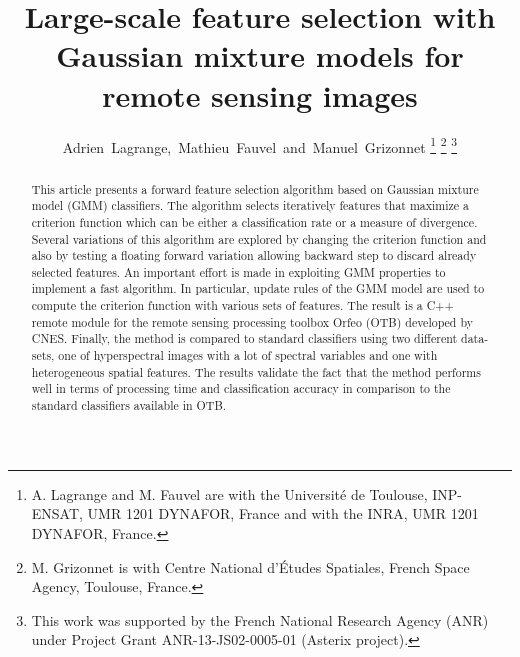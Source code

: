 \documentclass[journal]{IEEEtran}
\begin{document}
%
\title{Large-scale feature selection with Gaussian mixture models for remote sensing images}
%
%
%

\author{Adrien~Lagrange,~Mathieu~Fauvel~and~Manuel~Grizonnet%
\thanks{A. Lagrange and M. Fauvel are with the Universit\'{e} de Toulouse,
INP-ENSAT, UMR 1201 DYNAFOR, France and with the INRA, UMR 1201
DYNAFOR, France.}%
\thanks{M. Grizonnet is with Centre National d'\'{E}tudes Spatiales, French Space Agency, Toulouse, France.}%
\thanks{This  work was  supported  by the  French National  Research Agency  (ANR)  under  Project Grant  ANR-13-JS02-0005-01  (Asterix project).}}


\maketitle

\begin{abstract}
This article presents a forward feature selection algorithm based on Gaussian mixture model (GMM) classifiers. The algorithm selects iteratively features that maximize a criterion function which can be either a classification rate or a measure of divergence. Several variations of this algorithm are explored by changing the criterion function and also by testing a floating forward variation allowing backward step to discard already selected features.
An important effort is made in exploiting GMM properties to implement a fast algorithm. In particular, update rules of the GMM model are used to compute the criterion function with various sets of features. The result is a C++ remote module for the remote sensing processing toolbox Orfeo (OTB) developed by CNES.
Finally, the method is compared to standard classifiers using two different data-sets, one of hyperspectral images with a lot of spectral variables and one with heterogeneous spatial features. The results validate the fact that the method performs well in terms of processing time and classification accuracy in comparison to the standard classifiers available in OTB.\\
\end{abstract}
\end{document}
